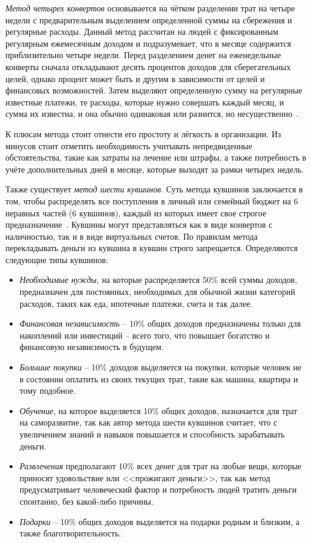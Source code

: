 \emph{Метод четырех конвертов} основывается на чётком разделении трат на четыре недели с предварительным выделением определенной суммы на сбережения и регулярные расходы.
Данный метод рассчитан на людей с фиксированным регулярным ежемесячным доходом и подразумевает, что в месяце содержится приблизительно четыре недели.
Перед разделением денег на еженедельные конверты сначала откладывают десять процентов доходов для сберегательных целей, однако процент может быть и другим в зависимости от целей и финансовых возможностей.
Затем выделяют определенную сумму на регулярные известные платежи, те расходы, которые нужно совершать каждый месяц, и сумма их известна, и она обычно одинаковая или разнится, но несущественно~\cite{four_envelope_rule}.

К плюсам метода стоит отнести его простоту и лёгкость в организации.
Из минусов стоит отметить необходимость учитывать непредвиденные обстоятельства, такие как затраты на лечение или штрафы, а также потребность в учёте дополнительных дней в месяце, которые выходят за рамки четырех недель.

Также существует \emph{метод шести кувшинов}.
Суть метода кувшинов заключается в том, чтобы распределять все поступления в личный или семейный бюджет на 6 неравных частей (6 кувшинов), каждый из которых имеет свое строгое предназначение~\cite{six_jugs}.
Кувшины могут представляться как в виде конвертов с наличностью, так и в виде виртуальных счетов.
По правилам метода перекладывать деньги из кувшина в кувшин строго запрещается.
Определяются следующие типы кувшинов:
\begin{itemize}
    \item \emph{Необходимые нужды}, на которые распределяется 50\% всей суммы доходов, предназначен для постоянных, необходимых для обычной жизни категорий расходов, таких как еда, ипотечные платежи, счета и так далее.
    \item \emph{Финансовая независимость} -- 10\% общих доходов предназначены только для накоплений или инвестиций -- всего того, что повышает богатство и финансовую независимость в будущем.
    \item \emph{Большие покупки} -- 10\% доходов выделяется на покупки, которые человек не в состоянии оплатить из своих текущих трат, такие как машина, квартира и тому подобное.
    \item \emph{Обучение}, на которое выделяется 10\% общих доходов, назначается для трат на саморазвитие, так как автор метода шести кувшинов считает, что с увеличением знаний и навыков повышается и способность зарабатывать деньги.
    \item \emph{Развлечения} предполагают 10\% всех денег для трат на любые вещи, которые приносят удовольствие или <<прожигают деньги>>, так как метод предусматривает человеческий фактор и потребность людей тратить деньги спонтанно, без какой-либо причины.
    \item \emph{Подарки} -- 10\% общих доходов выделяется на подарки родным и близким, а также благотворительность.
\end{itemize}

